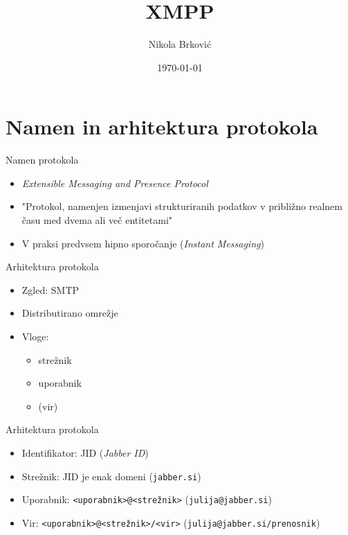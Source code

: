 \documentclass[presentation]{beamer}
\author{Nikola Brković}
\date{\today}
\title{XMPP}
\begin{document}
\maketitle

\section{Namen in arhitektura protokola}
\label{sec:org22cd60e}

\begin{frame}[label={sec:orgfb1dd64}]{Namen protokola}
\begin{itemize}
\item \emph{Extensible Messaging and Presence Protocol}
\item "Protokol, namenjen izmenjavi strukturiranih podatkov v približno
realnem času med dvema ali več entitetami"
\item V praksi predvsem hipno sporočanje (\emph{Instant Messaging})
\end{itemize}
\end{frame}

\begin{frame}[label={sec:org34f5cd7}]{Arhitektura protokola}
\begin{itemize}
\item Zgled: SMTP
\item Distributirano omrežje
\item Vloge:
\begin{itemize}
\item strežnik
\item uporabnik
\item (vir)
\end{itemize}
\end{itemize}
\end{frame}

\begin{frame}[label={sec:org72b7915},fragile]{Arhitektura protokola}
 \begin{itemize}
\item Identifikator: JID (\emph{Jabber ID})
\item Strežnik: JID je enak domeni (\texttt{jabber.si})
\item Uporabnik: \texttt{<uporabnik>@<strežnik>} (\texttt{julija@jabber.si})
\item Vir: \texttt{<uporabnik>@<strežnik>/<vir>} (\texttt{julija@jabber.si/prenosnik})
\end{itemize}
\end{frame}
\end{document}
